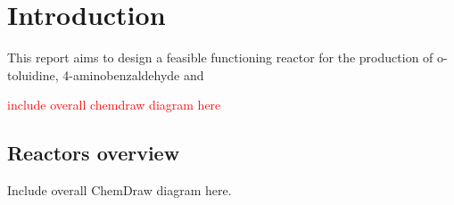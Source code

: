 \section{Introduction}
This report aims to design a feasible functioning reactor for the production of o-toluidine, 4-aminobenzaldehyde and 


\textcolor{red}{include overall chemdraw diagram here}
\subsection{Reactors overview}
Include overall ChemDraw diagram here. 




